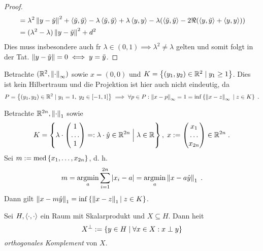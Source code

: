 \begin{proof}
\begin{align*}
	&= \lambda^2 \left\lVert y-\tilde y\right\rVert^2 + \left\langle\tilde y, \tilde y\right\rangle - \lambda \left\langle\tilde y, \tilde y\right\rangle + \lambda \left\langle y, y\right\rangle - \lambda (\left\langle\tilde y, \tilde y\right\rangle -2 \Re(\left\langle y,\tilde y\right\rangle + \left\langle y,y\right\rangle)) \\
	& = (\lambda^2 - \lambda) \left\lVert y-\tilde y\right\rVert^2 + d^2 
	\end{align*}
	Dies muss insbesondere auch f\us r \(\lambda \in (0,1) \implies \lambda^2 \neq \lambda\) gelten und somit folgt in der Tat. \(\left\lVert y-\tilde y\right\rVert = 0 \iff y = \tilde y\).
	\end{proof}
	
	\begin{ex}
		Betrachte \((\mathbb{R}^2, \left\lVert\cdot\right\rVert_\infty)\) sowie \(x = (0,0)\) und \(K = \left\{(y_1, y_2) \in \mathbb{R}^2\;\vert\; y_1 \geq 1\right\}\). Dies ist kein Hilbertraum und die Projektion ist hier auch nicht eindeutig, da 
		\[P = \left\{(y_1, y_2) \in \mathbb{R}^2\;\vert\; y_1 = 1,\; y_2 \in [-1,1]\right\} \implies \forall p \in P: \left\lVert x-p\right\rVert_\infty = 1 = \inf\left\{\left\lVert x-z\right\rVert_\infty \;\vert\; z \in K\right\}\;.\]
	\end{ex}
	
	\begin{ex}
		Betrachte \(\mathbb{R}^{2n},\left\lVert\cdot\right\rVert_{1}\) sowie \[K = \left\{\lambda \cdot \begin{pmatrix}1\\ \ldots\\1 \end{pmatrix} =: \lambda \cdot \hat y\in \mathbb{R}^{2n} \;\Big\vert\; \lambda \in \mathbb{R}\right\},\; x : = \begin{pmatrix}x_1\\ \ldots\\ x_{2n}\end{pmatrix} \in \mathbb{R}^{2n}\;.\] 
		Sei \(m : = \text{med}\left\{x_1,\ldots,x_{2n}\right\}\), d. h. 
		\[m = \underset{a}{\text{argmin}} \sum_{i=1}^{2n}\left\lvert x_i -a \right\rvert =  \underset{a}{\text{argmin}} \left\lVert x -a \hat y\right\rVert_{1}\;.\]
		Dann gilt  \(\left\lVert x-m \hat y\right\rVert_{1} = \inf\left\{\left\lVert x-z\right\rVert_{1}\vert \; z\in K\right\}\).
	\end{ex}
	
	\begin{definition}
		Sei \(H, \left\langle\cdot, \cdot\right\rangle\) ein Raum mit Skalarprodukt und \(X\subseteq H\). Dann  hei\s t
		\[X^\perp := \left\{y\in H \;\vert\; \forall x \in X: x \perp y\right\}\]
		\textit{orthogonales Komplement} von $X$.
	\end{definition}
	
